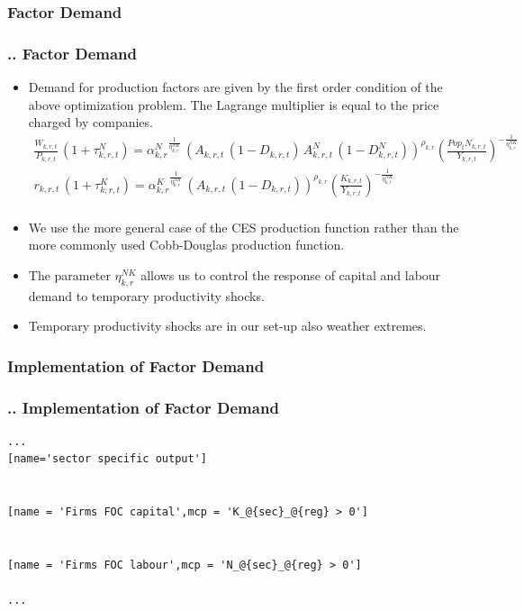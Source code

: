 \documentclass[11pt,aspectratio=169]{beamer}
\begin{document}
\subsubsection{Factor Demand}
\begin{frame}
\frametitle{{\thesection.\thesubsection.\thesubsubsection} Factor Demand}
\scriptsize
\begin{itemize}
\item Demand for production factors are given by the first order condition of the above optimization problem. The Lagrange multiplier is equal to the price charged by companies. 
\begin{align*}
\frac{W_{k,r,t}}{P_{k,r,t}}  \, (1 + \tau^{N}_{k,r,t}) = {\alpha^{N}_{k,r}}^{\frac{1}{\eta^{NK}_{k,r}}} \, \left(A_{k,r,t} \, (1 - D_{k,r,t}) \, A^N_{k,r,t} \, (1 - D^N_{k,r,t})\right)^{\rho_{k,r}} \left(\frac{Pop_{t} N_{k,r,t}}{Y_{k,r,t}}\right)^{-\frac{1}{\eta^{NK}_{k,r}}} \nonumber \\ 
r_{k,r,t} \, (1 + \tau^{K}_{k,r,t}) = {\alpha^{K}_{k,r}}^{\frac{1}{\eta^{NK}_{k,r}}} \, \left(A_{k,r,t} \, (1 - D_{k,r,t})\right)^{\rho_{k,r}}\left(\frac{K_{k,r,t}}{Y_{k,r,t}} \right)^{-\frac{1}{\eta^{NK}_{k,r}}} \\ 
\end{align*}
\item We use the more general case of the CES production function rather than the more commonly used Cobb-Douglas production function. 
\item The parameter $\eta^{NK}_{k,r}$ allows us to control the response of capital and labour demand to temporary productivity shocks. 
\item Temporary productivity shocks are in our set-up also weather extremes. 
\end{itemize}
\end{frame}

\subsubsection{Implementation of Factor Demand}
\begin{frame}[fragile]
\frametitle{{\thesection.\thesubsection.\thesubsubsection} Implementation of Factor Demand}

\begin{lstlisting}[frame = single]
...
[name='sector specific output']


[name = 'Firms FOC capital',mcp = 'K_@{sec}_@{reg} > 0']


[name = 'Firms FOC labour',mcp = 'N_@{sec}_@{reg} > 0']

...
\end{lstlisting}
\end{frame}
\end{document}
